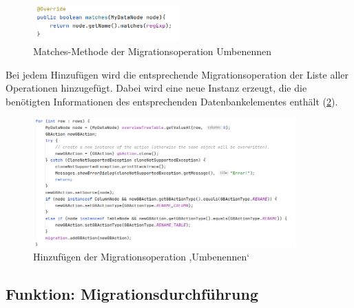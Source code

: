 	\begin{figure}[h]
		\centering
		\includegraphics[width=0.5\textwidth]{images/ui/matches}
		\caption{Matches-Methode der Migrationsoperation Umbenennen}
		\label{img:ui:matches}
	\end{figure}
	Bei jedem Hinzufügen wird die entsprechende Migrationsoperation der Liste aller Operationen hinzugefügt. Dabei wird eine neue Instanz erzeugt, die die benötigten Informationen des entsprechenden Datenbankelementes enthält (\ref{img:ui:overviewAddRenameSrc}).
	\begin{figure}[H]
		\centering
		\includegraphics[width=0.9\textwidth]{images/ui/overviewAddRenameSrc}
		\caption{Hinzufügen der Migrationsoperation ,Umbenennen‘}
		\label{img:ui:overviewAddRenameSrc}
	\end{figure}
\subsection{Funktion: Migrationsdurchführung}
	
